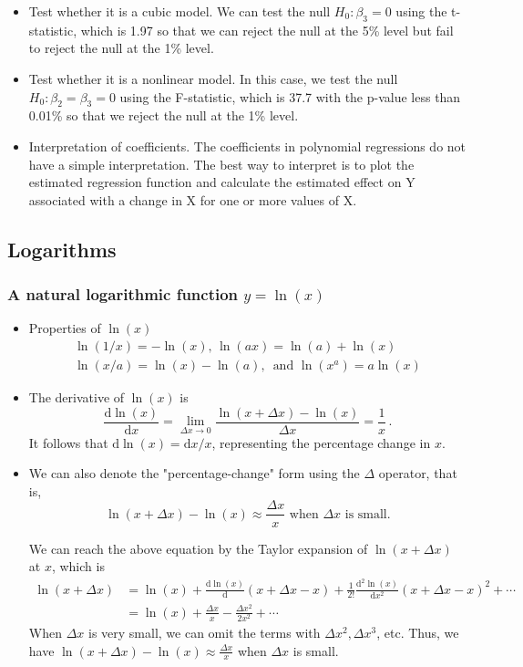 \documentclass[a4paper,11pt]{article}
\newcommand{\dx}{\mathrm{d}}
\begin{document}
\begin{itemize}
\item Test whether it is a cubic model. We can test the null \(H_0: \beta_3
  = 0\) using the t-statistic, which is 1.97 so that we can reject the
null at the 5\% level but fail to reject the null at the 1\% level.
\item Test whether it is a nonlinear model. In this case, we test the null
\(H_0: \beta_2 = \beta_3 = 0\) using the F-statistic, which is 37.7
with the p-value less than 0.01\% so that we reject the null at the
1\% level.
\item Interpretation of coefficients. The coefficients in polynomial
regressions do not have a simple interpretation. The best way to
interpret is to plot the estimated regression function and calculate
the estimated effect on Y associated with a change in X for one or
more values of X.
\end{itemize}


\subsection{Logarithms}
\label{sec:org6258ffc}
\subsubsection*{A natural logarithmic function \(y = \ln(x)\)}
\label{sec:org6178648}
\begin{itemize}
\item Properties of \(\ln(x)\)
\begin{gather*}
\ln(1/x) = -\ln(x),\, \ln(ax) = \ln(a) + \ln(x) \\
\ln(x/a) = \ln(x) - \ln(a),\, \text{ and } \ln(x^a) = a\ln(x)
\end{gather*}

\item The derivative of \(\ln(x)\) is
\[ \frac{\dx \ln(x)}{\dx x} = \lim_{\Delta x \rightarrow 0}
  \frac{\ln(x + \Delta x) - \ln(x)}{\Delta x} = \frac{1}{x}\,\text{.} \]
It follows that \(\dx \ln(x) = \dx x / x\), representing the percentage
change in \(x\).

\item We can also denote the "percentage-change" form using the \(\Delta\)
operator, that is,
\[ \ln(x + \Delta x) - \ln(x) \approx \frac{\Delta x}{x} \text{ when
  } \Delta x \text{ is small.} \]

We can reach the above equation by the Taylor expansion of \(\ln(x +
  \Delta x)\) at \(x\), which is
\begin{align*}
\ln(x + \Delta x) &= \ln(x) + \frac{\dx \ln(x)}{\dx} (x + \Delta x - x) + \frac{1}{2!}\frac{\dx^2 \ln(x)}{\dx x^2}(x + \Delta x - x)^2 + \cdots \\
&= \ln(x) + \frac{\Delta x}{x} -\frac{\Delta x^2}{2x^2} + \cdots
\end{align*}
When \(\Delta x\) is very small, we can omit the terms with \(\Delta
  x^2, \Delta x^3\), etc. Thus, we have \(\ln(x + \Delta x) - \ln(x)
  \approx \frac{\Delta x}{x}\) when \(\Delta x\) is small.
\end{itemize}
\end{document}
